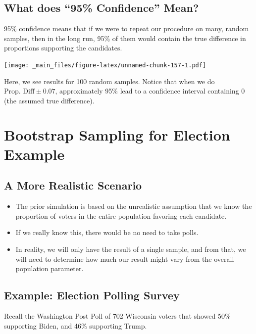 \documentclass[]{book}
\begin{document}
\subsection{\texorpdfstring{What does ``95\% Confidence''
Mean?}{What does 95\% Confidence Mean?}}\label{what-does-95-confidence-mean}

95\% confidence means that if we were to repeat our procedure on many,
random samples, then in the long run, 95\% of them would contain the
true difference in proportions supporting the candidates.

\texttt{[image: \_main\_files/figure-latex/unnamed-chunk-157-1.pdf]}

Here, we see results for 100 random samples. Notice that when we do
\(\text{Prop. Diff} \pm 0.07\), approximately 95\% lead to a confidence
interval containing 0 (the assumed true difference).

\section{Bootstrap Sampling for Election
Example}\label{bootstrap-sampling-for-election-example}

\subsection{A More Realistic Scenario}\label{a-more-realistic-scenario}

\begin{itemize}
\item
  The prior simulation is based on the unrealistic assumption that we
  know the proportion of voters in the entire population favoring each
  candidate.
\item
  If we really know this, there would be no need to take polls.
\item
  In reality, we will only have the result of a single sample, and from
  that, we will need to determine how much our result might vary from
  the overall population parameter.
\end{itemize}

\subsection{Example: Election Polling
Survey}\label{example-election-polling-survey}

Recall the Washington Post Poll of 702 Wisconsin voters that showed 50\%
supporting Biden, and 46\% supporting Trump.
\end{document}
